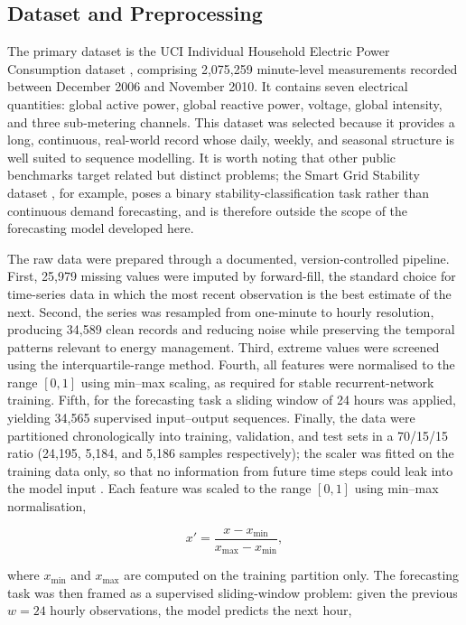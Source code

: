 \documentclass[conference]{IEEEtran}
\begin{document}
\subsection{Dataset and Preprocessing}
The primary dataset is the UCI Individual Household Electric Power Consumption
dataset \cite{hebrail2012individual}, comprising 2{,}075{,}259 minute-level
measurements recorded between December 2006 and November 2010. It contains seven
electrical quantities: global active power, global reactive power, voltage,
global intensity, and three sub-metering channels. This dataset was selected
because it provides a long, continuous, real-world record whose daily, weekly,
and seasonal structure is well suited to sequence modelling. It is worth noting
that other public benchmarks target related but distinct problems; the Smart
Grid Stability dataset \cite{arzamasov2018towards}, for example, poses a binary
stability-classification task rather than continuous demand forecasting, and is
therefore outside the scope of the forecasting model developed here.
 
The raw data were prepared through a documented, version-controlled pipeline.
First, 25{,}979 missing values were imputed by forward-fill, the standard choice
for time-series data in which the most recent observation is the best estimate
of the next. Second, the series was resampled from one-minute to hourly
resolution, producing 34{,}589 clean records and reducing noise while preserving
the temporal patterns relevant to energy management. Third, extreme values were
screened using the interquartile-range method. Fourth, all features were
normalised to the range $[0,1]$ using min--max scaling, as required for stable
recurrent-network training. Fifth, for the forecasting task a sliding window of
24 hours was applied, yielding 34{,}565 supervised input--output sequences.
Finally, the data were partitioned chronologically into training, validation,
and test sets in a 70/15/15 ratio (24{,}195, 5{,}184, and 5{,}186 samples
respectively); the scaler was fitted on the training data only, so that no
information from future time steps could leak into the model input
\cite{makridakis2018statistical}. Each feature was scaled to the range $[0,1]$ using min--max normalisation,
 
\begin{equation}
x' = \frac{x - x_{\min}}{x_{\max} - x_{\min}}, \label{eq:minmax}
\end{equation}
 
where $x_{\min}$ and $x_{\max}$ are computed on the training partition only. The
forecasting task was then framed as a supervised sliding-window problem: given
the previous $w = 24$ hourly observations, the model predicts the next hour,
 
\end{document}
